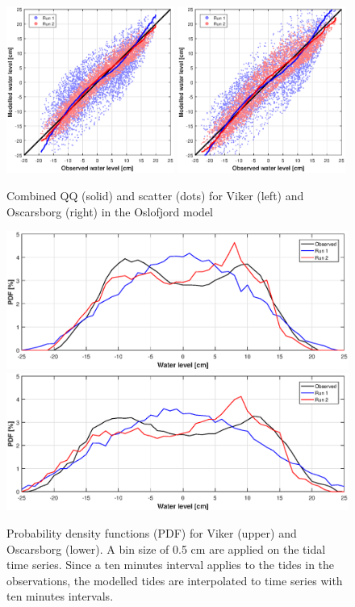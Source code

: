 \begin{figure}[!t]
\centering
\includegraphics[width=0.49\textwidth]{fig_Viker_QQ_Scatter}
\includegraphics[width=0.49\textwidth]{fig_Oscarsborg_QQ_Scatter}
\caption{Combined QQ (solid) and scatter (dots) for Viker (left) and Oscarsborg (right) in the Oslofjord model}
\label{fig:Oslo_QQ_Scatter}
\end{figure}

\begin{figure}[!t]
\centering
\includegraphics[width=\textwidth]{fig_Viker_PDF}
\includegraphics[width=\textwidth]{fig_Oscarsborg_PDF}
\caption{Probability density functions (PDF) for Viker (upper) and Oscarsborg (lower). A bin size of 0.5 cm are applied on the tidal time series. Since a ten minutes interval applies to the tides in the observations, the modelled tides are interpolated to time series with ten minutes intervals.}
\label{fig:Oslo_PDF}
\end{figure}


